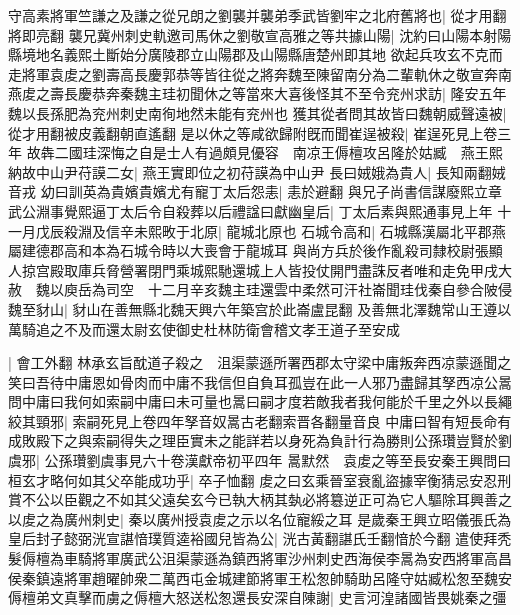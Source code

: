 守高素將軍竺謙之及謙之從兄朗之劉襲并襲弟季武皆劉牢之北府舊將也|{
	從才用翻將即亮翻}
襲兄冀州刺史軌邀司馬休之劉敬宣高雅之等共據山陽|{
	沈約曰山陽本射陽縣境地名義熙土斷始分廣陵郡立山陽郡及山陽縣唐楚州即其地}
欲起兵攻玄不克而走將軍袁䖍之劉壽高長慶郭恭等皆往從之將奔魏至陳留南分為二輩軌休之敬宣奔南燕䖍之壽長慶恭奔秦魏主珪初聞休之等當來大喜後怪其不至令兖州求訪|{
	隆安五年魏以長孫肥為兖州刺史南徇地然未能有兖州也}
獲其從者問其故皆曰魏朝威聲遠被|{
	從才用翻被皮義翻朝直遙翻}
是以休之等咸欲歸附旣而聞崔逞被殺|{
	崔逞死見上卷三年}
故犇二國珪深悔之自是士人有過頗見優容　南凉王傉檀攻呂隆於姑臧　燕王熙納故中山尹苻謨二女|{
	燕王實即位之初苻謨為中山尹}
長曰娀娥為貴人|{
	長知兩翻娀音戎}
幼曰訓英為貴嬪貴嬪尤有寵丁太后怨恚|{
	恚於避翻}
與兄子尚書信謀廢熙立章武公淵事覺熙逼丁太后令自殺葬以后禮諡曰獻幽皇后|{
	丁太后素與熙通事見上年}
十一月戊辰殺淵及信辛未熙畋于北原|{
	龍城北原也}
石城令高和|{
	石城縣漢屬北平郡燕屬建德郡高和本為石城令時以大喪會于龍城耳}
與尚方兵於後作亂殺司隸校尉張顯人掠宫殿取庫兵脅營署閉門乘城熙馳還城上人皆投仗開門盡誅反者唯和走免甲戌大赦　魏以庾岳為司空　十二月辛亥魏主珪還雲中柔然可汗社崙聞珪伐秦自參合陂侵魏至豺山|{
	豺山在善無縣北魏天興六年築宫於此崙盧昆翻}
及善無北澤魏常山王遵以萬騎追之不及而還太尉玄使御史杜林防衛會稽文孝王道子至安成

|{
	會工外翻}
林承玄旨酖道子殺之　沮渠蒙遜所署西郡太守梁中庸叛奔西凉蒙遜聞之笑曰吾待中庸恩如骨肉而中庸不我信但自負耳孤豈在此一人邪乃盡歸其孥西凉公暠問中庸曰我何如索嗣中庸曰未可量也暠曰嗣才度若敵我者我何能於千里之外以長繩絞其頸邪|{
	索嗣死見上卷四年孥音奴暠古老翻索晋各翻量音良}
中庸曰智有短長命有成敗殿下之與索嗣得失之理臣實未之能詳若以身死為負計行為勝則公孫瓚豈賢於劉虞邪|{
	公孫瓚劉虞事見六十卷漢獻帝初平四年}
暠默然　袁䖍之等至長安秦王興問曰桓玄才略何如其父卒能成功乎|{
	卒子恤翻}
䖍之曰玄乘晉室衰亂盜據宰衡猜忌安忍刑賞不公以臣觀之不如其父遠矣玄今已執大柄其埶必將簒逆正可為它人驅除耳興善之以䖍之為廣州刺史|{
	秦以廣州授袁䖍之示以名位寵綏之耳}
是歲秦王興立昭儀張氏為皇后封子懿弼洸宣諶愔璞質逵裕國兒皆為公|{
	洸古黃翻諶氏壬翻愔於今翻}
遣使拜秃髮傉檀為車騎將軍廣武公沮渠蒙遜為鎮西將軍沙州刺史西海侯李暠為安西將軍高昌侯秦鎮遠將軍趙曜帥衆二萬西屯金城建節將軍王松怱帥騎助呂隆守姑臧松怱至魏安傉檀弟文真擊而虜之傉檀大怒送松怱還長安深自陳謝|{
	史言河湟諸國皆畏姚秦之彊}


